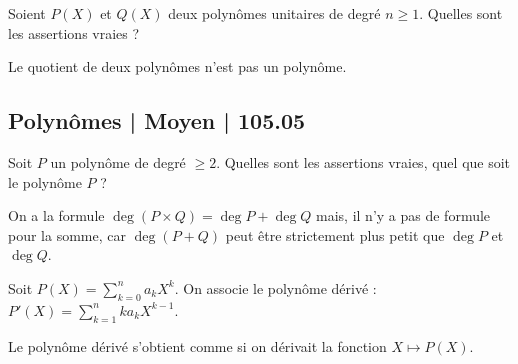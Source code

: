 \begin{question}
Soient $P(X)$ et $Q(X)$ deux polynômes unitaires de degré $n\ge1$.
Quelles sont les assertions vraies ?
\begin{answers}

    

\end{answers}
\begin{explanations}
Le quotient de deux polynômes n'est pas un polynôme.
\end{explanations}
\end{question}


\subsection{Polynômes | Moyen | 105.05}


\begin{question}
Soit $P$ un polynôme de degré $\ge 2$.
Quelles sont les assertions vraies, quel que soit le polynôme $P$ ?
\begin{answers}



\end{answers}
\begin{explanations}
On a la formule $\deg(P\times Q) = \deg P + \deg Q$ mais, il n'y a pas de formule pour la somme, car $\deg(P + Q)$ peut être strictement plus petit que $\deg P$ et $\deg Q$.
\end{explanations}
\end{question}


\begin{question}
Soit $P(X) = \sum_{k=0}^n a_k X^k$. On associe le polynôme dérivé :
$P'(X) = \sum_{k=1}^n ka_k X^{k-1}$.
\begin{answers}



\end{answers}
\begin{explanations}
Le polynôme dérivé s'obtient comme si on dérivait la fonction $X \mapsto P(X)$. 
\end{explanations}
\end{question}


